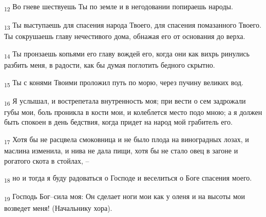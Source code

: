 \begin{tcolorbox}
\textsubscript{12} Во гневе шествуешь Ты по земле и в негодовании попираешь народы.
\end{tcolorbox}
\begin{tcolorbox}
\textsubscript{13} Ты выступаешь для спасения народа Твоего, для спасения помазанного Твоего. Ты сокрушаешь главу нечестивого дома, обнажая его от основания до верха.
\end{tcolorbox}
\begin{tcolorbox}
\textsubscript{14} Ты пронзаешь копьями его главу вождей его, когда они как вихрь ринулись разбить меня, в радости, как бы думая поглотить бедного скрытно.
\end{tcolorbox}
\begin{tcolorbox}
\textsubscript{15} Ты с конями Твоими проложил путь по морю, через пучину великих вод.
\end{tcolorbox}
\begin{tcolorbox}
\textsubscript{16} Я услышал, и вострепетала внутренность моя; при вести о сем задрожали губы мои, боль проникла в кости мои, и колеблется место подо мною; а я должен быть спокоен в день бедствия, когда придет на народ мой грабитель его.
\end{tcolorbox}
\begin{tcolorbox}
\textsubscript{17} Хотя бы не расцвела смоковница и не было плода на виноградных лозах, и маслина изменила, и нива не дала пищи, хотя бы не стало овец в загоне и рогатого скота в стойлах, --
\end{tcolorbox}
\begin{tcolorbox}
\textsubscript{18} но и тогда я буду радоваться о Господе и веселиться о Боге спасения моего.
\end{tcolorbox}
\begin{tcolorbox}
\textsubscript{19} Господь Бог--сила моя: Он сделает ноги мои как у оленя и на высоты мои возведет меня! (Начальнику хора).
\end{tcolorbox}
